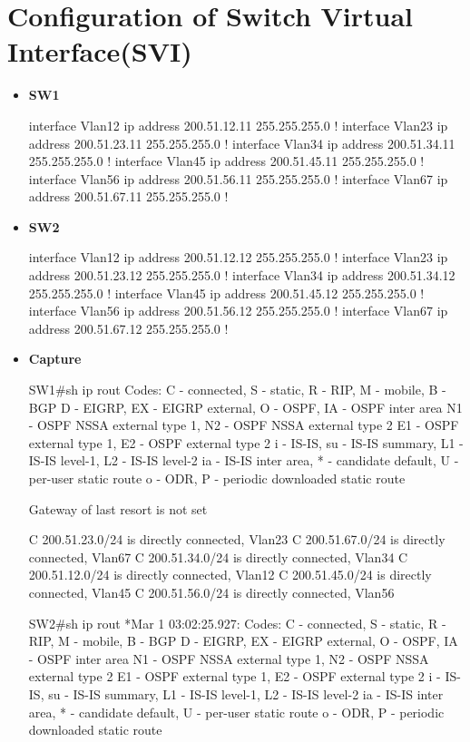 \documentclass[10pt]{article}
\begin{document}
\section{Configuration of Switch Virtual Interface(SVI)}
\begin{itemize}
	\item {\bf SW1}
	\begin{verbatim*}
		interface Vlan12
		 ip address 200.51.12.11 255.255.255.0
		!
		interface Vlan23
		 ip address 200.51.23.11 255.255.255.0
		!
		interface Vlan34
		 ip address 200.51.34.11 255.255.255.0
		!
		interface Vlan45
		 ip address 200.51.45.11 255.255.255.0
		!
		interface Vlan56
		 ip address 200.51.56.11 255.255.255.0
		!
		interface Vlan67
		 ip address 200.51.67.11 255.255.255.0
		!
	\end{verbatim*}
	\item {\bf SW2}
	\begin{verbatim*}
		interface Vlan12
		 ip address 200.51.12.12 255.255.255.0
		!
		interface Vlan23
		 ip address 200.51.23.12 255.255.255.0
		!
		interface Vlan34
		 ip address 200.51.34.12 255.255.255.0
		!
		interface Vlan45
		 ip address 200.51.45.12 255.255.255.0
		!
		interface Vlan56
		 ip address 200.51.56.12 255.255.255.0
		!
		interface Vlan67
		 ip address 200.51.67.12 255.255.255.0
		!
	\end{verbatim*}
	\item {\bf Capture}
	\begin{verbatim*}
		SW1#sh ip rout
		Codes: C - connected, S - static, R - RIP, M - mobile, B - BGP
		D - EIGRP, EX - EIGRP external, O - OSPF, IA - OSPF inter area
		N1 - OSPF NSSA external type 1, N2 - OSPF NSSA external type 2
		E1 - OSPF external type 1, E2 - OSPF external type 2
		i - IS-IS, su - IS-IS summary, L1 - IS-IS level-1, L2 - IS-IS level-2
		ia - IS-IS inter area, * - candidate default, U - per-user static route
		o - ODR, P - periodic downloaded static route

		Gateway of last resort is not set

		C    200.51.23.0/24 is directly connected, Vlan23
		C    200.51.67.0/24 is directly connected, Vlan67
		C    200.51.34.0/24 is directly connected, Vlan34
		C    200.51.12.0/24 is directly connected, Vlan12
		C    200.51.45.0/24 is directly connected, Vlan45
		C    200.51.56.0/24 is directly connected, Vlan56

		SW2#sh ip rout
		*Mar  1 03:02:25.927: %SYS-5-CONFIG_I: Configured from console by console
		Codes: C - connected, S - static, R - RIP, M - mobile, B - BGP
		D - EIGRP, EX - EIGRP external, O - OSPF, IA - OSPF inter area
		N1 - OSPF NSSA external type 1, N2 - OSPF NSSA external type 2
		E1 - OSPF external type 1, E2 - OSPF external type 2
		i - IS-IS, su - IS-IS summary, L1 - IS-IS level-1, L2 - IS-IS level-2
		ia - IS-IS inter area, * - candidate default, U - per-user static route
		o - ODR, P - periodic downloaded static route


\end{verbatim*}
\end{itemize}
\end{document}
